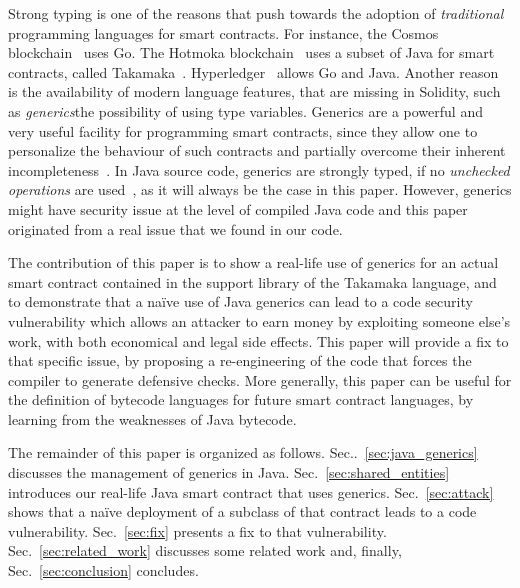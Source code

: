 Strong typing is one of the reasons that push towards the adoption
of \emph{traditional} programming languages for smart contracts. For instance,
the Cosmos blockchain~\cite{cosmos} uses Go. The
Hotmoka blockchain~\cite{hotmoka} uses a subset of Java
for smart contracts, called Takamaka~\cite{Spoto19,Spoto20}.
Hyperledger~\cite{hyperldeger} allows Go and Java.
Another reason is the availability of modern
language features, that are missing in Solidity,
such as \emph{generics}\ie the possibility of using
type variables. Generics are a powerful and very useful facility for programming
smart contracts, since they allow one to personalize the behaviour of such contracts and partially overcome their inherent incompleteness~\cite{ebp}. In Java source code, generics are strongly typed, if no \emph{unchecked operations}
are used~\cite{NaftalinW06}, as it will always be the case in this paper.
However, generics might have security issue at the level of compiled Java code and this paper originated from a
real issue that we found in our code.




The contribution of this paper is to show a real-life
use of generics for an actual smart contract contained in the support
library of the Takamaka language, and to demonstrate that a na\"{i}ve use
of Java generics can lead to a code security vulnerability which
allows an attacker to earn money by exploiting someone else's work, with both economical and legal side effects.
This paper will provide a fix to that specific issue,
by proposing a re-engineering of the code that forces the compiler to generate defensive checks.
More generally, this paper can be useful for the definition of
bytecode languages for future smart contract languages, by
learning from the weaknesses of Java bytecode.

The remainder of this paper is organized as follows.
Sec..~\ref{sec:java_generics} discusses the management of generics in Java.
Sec.~\ref{sec:shared_entities} introduces our real-life Java smart
contract that uses generics. Sec.~\ref{sec:attack} shows that a na\"{i}ve
deployment of a subclass of that contract leads to a code vulnerability.
Sec.~\ref{sec:fix} presents a fix to that vulnerability.
Sec.~\ref{sec:related_work} discusses some related work and, finally,
Sec.~\ref{sec:conclusion} concludes.

